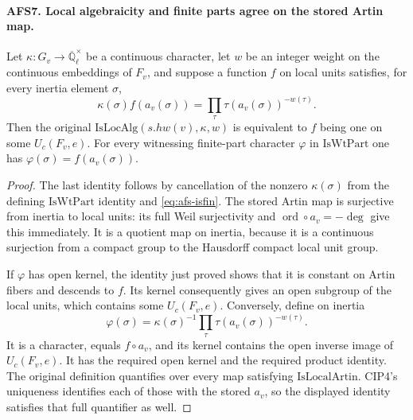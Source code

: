 \documentclass[11pt,a4paper]{article}
\numberwithin{equation}{section}
\theoremstyle{remark}\newtheorem{remark}[theorem]{Remark}
\begin{document}
\paragraph{AFS7. Local algebraicity and finite parts agree on the stored Artin map.}
\label{claim:AFS7}
Let $\kappa:G_v\to\overline{\mathbb Q}_\ell^{\times}$ be a
continuous character, let $w$ be an integer weight on the
continuous embeddings of $F_v$, and suppose a function $f$
on local units satisfies, for every inertia element $\sigma$,
\begin{equation}\label{eq:afs-isfin}
 \kappa(\sigma)f(a_v(\sigma))
                =\prod_\tau\tau(a_v(\sigma))^{-w(\tau)}.
\end{equation}
Then the original $\mathrm{IsLocAlg}(s.hw(v),\kappa,w)$ is
equivalent to $f$ being one on some $U_c(F_v,e)$.
For every witnessing finite-part character $\varphi$ in
$\mathrm{IsWtPart}$ one has
$\varphi(\sigma)=f(a_v(\sigma))$.
\begin{proof}
The last identity follows by cancellation of the nonzero
$\kappa(\sigma)$ from the defining $\mathrm{IsWtPart}$
identity and \eqref{eq:afs-isfin}.  The stored Artin map is
surjective from inertia to local units: its full Weil
surjectivity and $\operatorname{ord}\circ a_v=-\deg$ give
this immediately.  It is a quotient map on inertia, because
it is a continuous surjection from a compact group to the
Hausdorff compact local unit group.

If $\varphi$ has open kernel, the identity just proved shows
that it is constant on Artin fibers and descends to $f$.
Its kernel consequently gives an open subgroup of the local
units, which contains some $U_c(F_v,e)$.  Conversely, define
on inertia
\[
 \varphi(\sigma)=\kappa(\sigma)^{-1}
                       \prod_\tau\tau(a_v(\sigma))^{-w(\tau)}.
\]
It is a character, equals $f\circ a_v$, and its kernel
contains the open inverse image of $U_c(F_v,e)$.  It has
the required open kernel and the required product identity.
The original definition quantifies over every map satisfying
$\mathrm{IsLocalArtin}$.  CIP4's uniqueness identifies each
of those with the stored $a_v$, so the displayed identity
satisfies that full quantifier as well.
\end{proof}

\end{document}
